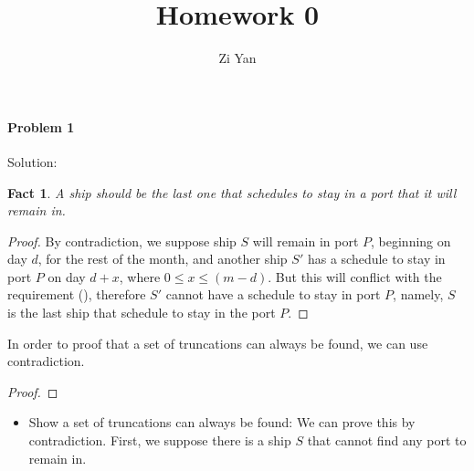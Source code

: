 \documentclass[12pt,letterpaper]{article}
\author{Zi Yan}
\title{Homework 0}
\begin{document}
\maketitle

\paragraph*{Problem 1}
Solution: 

\newtheorem{fact1}{Fact}

\begin{fact1}\label{fact}
A ship should be the last one that schedules to stay in a port that it 
will remain in.
\end{fact1}

\begin{proof}
By contradiction, we suppose ship $S$ will remain in port $P$, beginning on
day $d$, for the rest of the month, and another ship $S'$  has a schedule to
stay in port $P$ on day $d+x$, where $0 \le x \le (m - d)$. But this will 
conflict with the requirement (\textdagger), therefore $S'$ cannot have a 
schedule to stay in port $P$, namely, $S$ is the last ship that schedule to 
stay in the port $P$.
\end{proof}

In order to proof that a set of truncations can always be found, we can
use contradiction.

\begin{proof}

\end{proof}

\begin{itemize}
    \item Show a set of truncations can always be found: We can prove this by
contradiction. First, we suppose there is a ship $S$ that cannot find any port
to remain in. 
\end{itemize}
\end{document}
